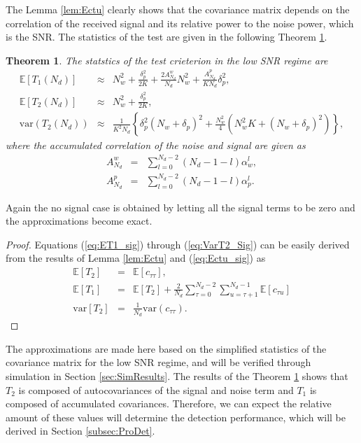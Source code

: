 \documentclass[draftclsnofoot,onecolumn,12pt]{IEEEtran}
\newtheorem{theorem}{Theorem}\newtheorem{lemma}{Lemma}
\begin{document}
The Lemma \ref{lem:Ectu} clearly shows that the covariance matrix depends on the correlation of the received signal and its relative power to the noise power, which is the SNR.
The statistics of the test are given in the following Theorem \ref{thm:ET1T2}. 
\begin{theorem}\label{thm:ET1T2}
The statstics of the test crieterion in the low SNR regime are
  \begin{eqnarray}
    \mathbb{E}[T_1(N_d)] &\approx& N_w^2 + \frac{\delta_p^2}{2K}
      + \frac{2A_{N_d}^w}{N_d}N_w^2 + \frac{A_{N_d}^p}{KN_d}\delta_p^2 , \label{eq:ET1_sig} \\
      \mathbb{E}[T_2(N_d)] &\approx& N_w^2 + \frac{\delta_p^2}{2K}, \label{eq:ET2_Sig} \\
    \mathrm{var}(T_2(N_d)) &\approx& \frac{1}{K^2N_d} \left\{\delta_p^2 (N_w + \delta_p)^2 + \frac{N_w^2}{4}\left(N_w^2K + \left(N_w + \delta_p\right)^2 \right) \right\},  \label{eq:VarT2_Sig}
  \end{eqnarray}
  where the accumulated correlation of the noise and signal are given as
  \begin{eqnarray}
    A_{N_d}^w &=& \sum_{l = 0}^{N_d-2} (N_d - 1 - l) \alpha_w^l, \\
    A_{N_d}^p &=& \sum_{l = 0}^{N_d-2} (N_d - 1 - l) \alpha_p^l.
    \label{eq:A_Nd}
  \end{eqnarray}
\end{theorem}
Again the no signal case is obtained by letting all the signal terms to be zero and the approximations become exact.

\begin{proof}
Equations (\ref{eq:ET1_sig}) through (\ref{eq:VarT2_Sig}) can be easily derived from the results of Lemma \ref{lem:Ectu} and (\ref{eq:Ectu_sig}) as
  \begin{eqnarray}
    \mathbb{E}[T_2] &=& \mathbb{E}[c_{\tau \tau}],\\
    \mathbb{E}[T_1] &=& \mathbb{E}[T_2] + \frac{2}{N_d} \sum_{\tau = 0}^{N_d-2} \sum_{u = \tau+1}^{N_d-1} \mathbb{E}[c_{\tau u}] \\
    \mathrm{var}[T_2]&=& \frac{1}{N_d} \mathrm{var}(c_{\tau \tau}).
    \label{eq:pf_thmET1T2}
  \end{eqnarray}
\end{proof}

The approximations are made here based on the simplified statistics of the covariance matrix for the low SNR regime, and will be verified through simulation in Section \ref{sec:SimResults}.
The results of the Theorem \ref{thm:ET1T2} shows that $T_2$ is composed of autocovariances of the signal and noise term and $T_1$ is composed of accumulated covariances. Therefore, we can expect the relative amount of these values will determine the detection performance,
which will be derived in Section \ref{subsec:ProDet}.
\end{document}

